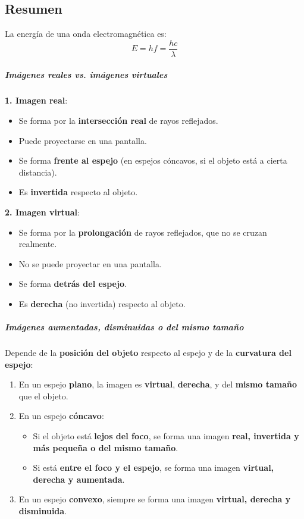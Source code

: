 \subsection{Resumen}

\begin{tcolorbox}[title=Energía de una onda electromagnética]
  La energía de una onda electromagnética es:
  \[
    E = hf = \frac{hc}{\lambda}
  \]
\end{tcolorbox}

\begin{tcolorbox}[title=Imágenes]
  \subparagraph{Imágenes reales vs. imágenes virtuales}

  \textbf{1. Imagen real}:
  \begin{itemize}
    \item Se forma por la \textbf{intersección real} de rayos reflejados.
    \item Puede proyectarse en una pantalla.
    \item Se forma \textbf{frente al espejo} (en espejos cóncavos, si el objeto está a cierta distancia).
    \item Es \textbf{invertida} respecto al objeto.
  \end{itemize}

  \textbf{2. Imagen virtual}:
  \begin{itemize}
    \item Se forma por la \textbf{prolongación} de rayos reflejados, que no se cruzan realmente.
    \item No se puede proyectar en una pantalla.
    \item Se forma \textbf{detrás del espejo}.
    \item Es \textbf{derecha} (no invertida) respecto al objeto.
  \end{itemize}
  \vspace{5pt}
  \subparagraph{Imágenes aumentadas, disminuidas o del mismo tamaño}

  Depende de la \textbf{posición del objeto} respecto al espejo y de la \textbf{curvatura del espejo}:
  \begin{enumerate}
    \item En un espejo \textbf{plano}, la imagen es \textbf{virtual}, \textbf{derecha}, y del \textbf{mismo tamaño} que el objeto.
    \item En un espejo \textbf{cóncavo}:
      \begin{itemize}
        \item Si el objeto está \textbf{lejos del foco}, se forma una imagen \textbf{real, invertida y más pequeña o del mismo tamaño}.
        \item Si está \textbf{entre el foco y el espejo}, se forma una imagen \textbf{virtual, derecha y aumentada}.
      \end{itemize}
    \item En un espejo \textbf{convexo}, siempre se forma una imagen \textbf{virtual, derecha y disminuida}.
  \end{enumerate}
\end{tcolorbox}